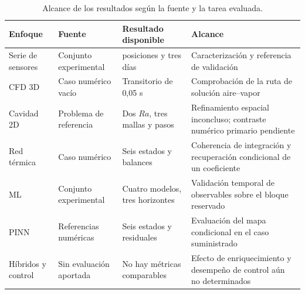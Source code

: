 \begin{table}[htbp]
\centering
\caption{Alcance de los resultados según la fuente y la tarea evaluada.}
\label{tab:res_alcance}
\small
\setlength{\tabcolsep}{5pt}
\begin{tabularx}{\textwidth}{>{\raggedright\arraybackslash}p{1.7cm}>{\raggedright\arraybackslash}p{2.0cm}>{\raggedright\arraybackslash}p{3.0cm}>{\raggedright\arraybackslash}X}
\toprule
Enfoque & Fuente & Resultado disponible & Alcance \\
\midrule
Serie de sensores & Conjunto experimental & 36 posiciones y tres días & Caracterización y referencia de validación \\
CFD 3D & Caso numérico vacío & Transitorio de 0,05 s & Comprobación de la ruta de solución aire--vapor \\
Cavidad 2D & Problema de referencia & Dos $Ra$, tres mallas y pasos & Refinamiento espacial inconcluso; contraste numérico primario pendiente \\
Red térmica & Caso numérico & Seis estados y balances & Coherencia de integración y recuperación condicional de un coeficiente \\
ML & Conjunto experimental & Cuatro modelos, tres horizontes & Validación temporal de observables sobre el bloque reservado \\
PINN & Referencias numéricas & Seis estados y residuales & Evaluación del mapa condicional en el caso suministrado \\
Híbridos y control & Sin evaluación aportada & No hay métricas comparables & Efecto de enriquecimiento y desempeño de control aún no determinados \\
\bottomrule
\end{tabularx}
\end{table}
